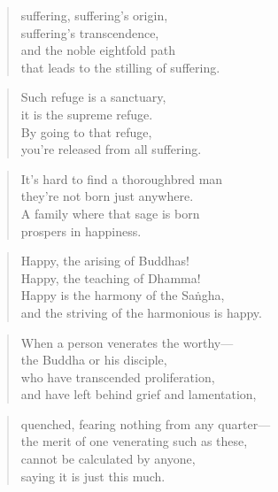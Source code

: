 \documentclass[12pt,openany]{book}%
\begin{document}
\begin{verse}%
suffering, suffering’s origin, \\
suffering’s transcendence, \\
and the noble eightfold path \\
that leads to the stilling of suffering. 

%
\end{verse}

\begin{verse}%
Such refuge is a sanctuary, \\
it is the supreme refuge. \\
By going to that refuge, \\
you’re released from all suffering. 

%
\end{verse}

\begin{verse}%
It’s hard to find a thoroughbred man \\
they’re not born just anywhere. \\
A family where that sage is born \\
prospers in happiness. 

%
\end{verse}

\begin{verse}%
Happy, the arising of Buddhas! \\
Happy, the teaching of Dhamma! \\
Happy is the harmony of the \textsanskrit{Saṅgha}, \\
and the striving of the harmonious is happy. 

%
\end{verse}

\begin{verse}%
When a person venerates the worthy—\\
the Buddha or his disciple, \\
who have transcended proliferation, \\
and have left behind grief and lamentation, 

%
\end{verse}

\begin{verse}%
quenched, fearing nothing from any quarter—\\
the merit of one venerating such as these, \\
cannot be calculated by anyone, \\
saying it is just this much. 

%
\end{verse}
\end{document}
